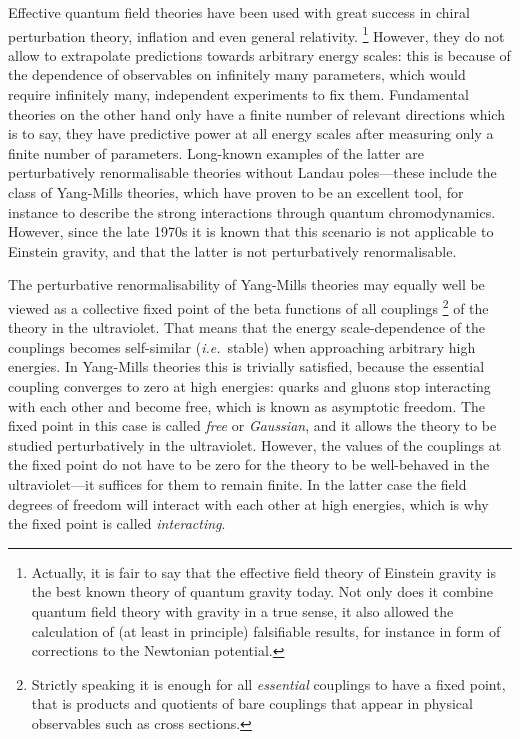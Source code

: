 \documentclass[11pt]{book}
\newcommand\ie{\textit{i.e.}\ }
\numberwithin{equation}{chapter}
\begin{document}
Effective quantum field theories have been used with great success
in chiral perturbation theory, inflation and even general relativity.%
\footnote{%
  Actually, it is fair to say that the effective field theory of Einstein gravity
  is the best known theory of quantum gravity today. Not only does it combine
  quantum field theory with gravity in a true sense, it also allowed the calculation
  of (at least in principle) falsifiable results, for instance in form of
  corrections to the Newtonian potential.
}
However, they do not allow to extrapolate predictions towards arbitrary energy scales:
this is because of the dependence of observables on infinitely many parameters, which
would require infinitely many, independent experiments to fix them. Fundamental
theories on the other hand only have a finite number of relevant directions which is
to say, they have predictive power at all energy scales after measuring only a
finite number of parameters. Long-known examples of the latter are perturbatively
renormalisable theories without Landau poles---these include the class of Yang-Mills theories,
which have proven to be an excellent tool,
for instance to describe the strong interactions through quantum chromodynamics.
However, since the late 1970s it is known that this scenario is not applicable to
Einstein gravity, and that the latter is not perturbatively renormalisable.

The perturbative renormalisability of Yang-Mills theories may
equally well be viewed as
a collective fixed point of the beta functions of all couplings%
\footnote{%
  Strictly speaking it is enough for all \textit{essential} couplings
  to have a fixed point, that is products and quotients of bare couplings
  that appear in physical observables such as cross sections.
}
of the theory in the ultraviolet. That means that the energy scale-dependence
of the couplings becomes self-similar (\ie stable) when approaching arbitrary
high energies. In Yang-Mills theories this is trivially satisfied, because
the essential coupling converges to zero at high energies: quarks and gluons stop interacting
with each other and become free, which is known as asymptotic freedom. The fixed
point in this case is called \textit{free} or \textit{Gaussian}, and it allows
the theory to be studied perturbatively in the ultraviolet. However, the values
of the couplings at the fixed point do not have to be zero for the theory to
be well-behaved in the ultraviolet---it suffices for them to remain finite.
In the latter case the field degrees of freedom will interact with each other at
high energies, which is why the fixed point is called \textit{interacting}.
\end{document}
